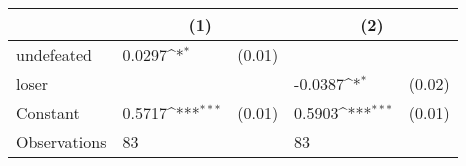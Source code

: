 {
\def\sym#1{\ifmmode^{#1}\else\(^{#1}\)\fi}
\begin{tabular*}{.7\hsize}{@{\hskip\tabcolsep\extracolsep\fill}l*{2}{lc}}
\toprule
                &\multicolumn{2}{c}{(1)}     &\multicolumn{2}{c}{(2)}     \\
\midrule
undefeated      &   0.0297\sym{*}  &   (0.01)&                  &         \\
loser           &                  &         &  -0.0387\sym{*}  &   (0.02)\\
Constant        &   0.5717\sym{***}&   (0.01)&   0.5903\sym{***}&   (0.01)\\
\midrule
Observations    &       83         &         &       83         &         \\
\bottomrule
\end{tabular*}
}
